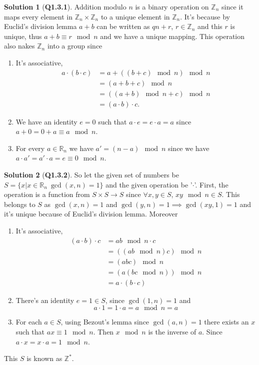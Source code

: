 \documentclass{article}
\theoremstyle{definition}
\newtheorem*{sol}{Solution}
\begin{document}
\begin{sol}[\textbf{Q1.3.1}]
	Addition modulo $n$ is a binary operation on $\mathbb{Z}_n$ since it maps every element in $\mathbb{Z}_n\times \mathbb{Z}_n$ to a unique element in $\mathbb{Z}_n$. It's because by Euclid's division lemma $a+b$ can be written as $qn+r$, $r\in \mathbb{Z}_n$ and this $r$ is unique, thus $a+b\equiv r\mod{n}$ and we have a unique mapping. This operation also nakes $\mathbb{Z}_n$ into a group since
	\begin{enumerate}
		\item It's associative, \begin{align}
			      a\cdot(b\cdot c) & = a+((b+c)\mod{n})\mod{n} \\ &= (a+b+c)\mod{n}\\ &= ((a+b)\mod{n}+c)\mod{n}\\ &= (a\cdot b)\cdot c.
		      \end{align}
		\item We have an identity $e=0$ such that $a\cdot e = e\cdot a= a$ since $a+0 = 0+a \equiv a\mod{n}$.
		\item For every $a\in \mathbb{R}_n$ we have $a' = (n-a)\mod{n}$ since we have $a\cdot a' = a'\cdot a= e \equiv 0\mod{n}$.
	\end{enumerate}
\end{sol}

\begin{sol}[\textbf{Q1.3.2}]
	So let the given set of numbers be $S=\{x |x\in \mathbb{R}_n \  \gcd(x,n) = 1\}$ and the given operation be '$\cdot$'. First, the operation is a function from $S\times S\rightarrow S$ since $\forall x,y \in S$, $xy\mod{n} \in S$. This belongs to $S$ as $\gcd(x,n)=1$ and $\gcd(y,n)=1 \implies \gcd(xy,1)=1$ and it's unique because of Euclid's division lemma. Moreover
	\begin{enumerate}
		\item It's associative,
		      \begin{align}
			      (a\cdot b)\cdot c & = ab\mod{n} \cdot c     \\
			                        & = ((ab\mod{n})c)\mod{n} \\
			                        & = (abc)\mod{n}          \\
			                        & = (a(bc\mod{n}))\mod{n} \\
			                        & = a\cdot(b\cdot c)
		      \end{align}
		\item There's an identity $e=1\in S$, since $\gcd(1,n)=1$ and
		      \begin{equation}
			      a\cdot 1 = 1 \cdot a = a \mod{n} = a
		      \end{equation}
		\item For each $a\in S$,  using Bezout's lemma since $\gcd(a,n)=1$ there exists an $x$ such that $ax\equiv 1\mod{n}$. Then $x\mod{n}$ is the inverse of $a$. Since $a\cdot x = x\cdot a = 1\mod{n}$.
	\end{enumerate}
	This $S$ is known as $\mathbb{Z}^*$.
\end{sol}
\end{document}
